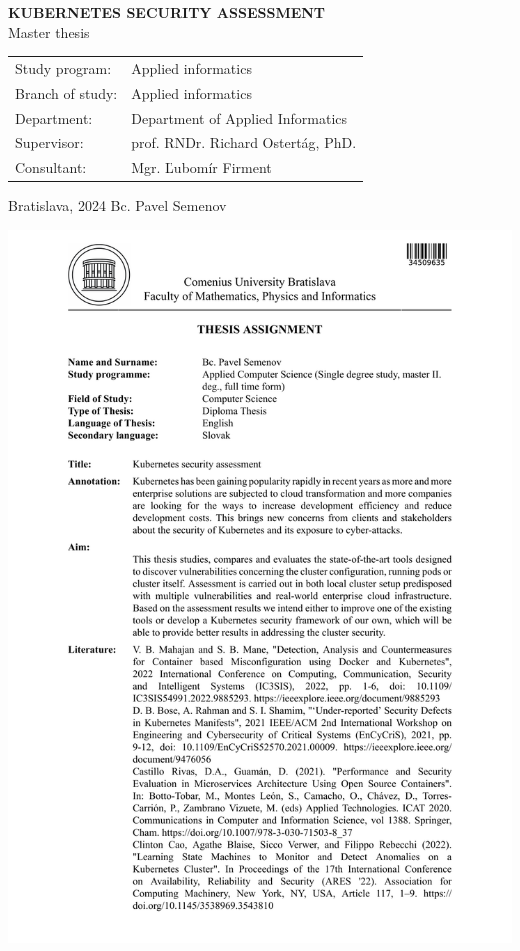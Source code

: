 \documentclass[12pt, oneside, openany]{book}
\def\mftitle{Kubernetes security assessment}
\def\mfthesistype{Master thesis}
\def\mfauthor{Bc. Pavel Semenov}
\def\mfskolitel{prof. RNDr. Richard Ostertág, PhD.}
\def\mfkonzultant{Mgr. Ľubomír Firment}
\def\mfplacedate{Bratislava, 2024}
\def\mfodbor{Applied informatics}
\def\program{Applied informatics}
\def\mfpracovisko{Department of Applied Informatics }
\begin{document}
\begin{center}
	\textbf{\MakeUppercase{\Large\mftitle}}\\
	\mfthesistype
\end{center}
\vfill


\begin{tabular}{l l}
Study program: & \program \\
Branch of study: & \mfodbor \\
Department: & \mfpracovisko \\
Supervisor: & \mfskolitel \\
Consultant: & \mfkonzultant \\
\end{tabular}

\vfill
\noindent
\mfplacedate \hfill
\mfauthor
\cleardoublepage




\newpage 
\thispagestyle{empty}
\hspace{-2cm}\includegraphics[page=1,width=1.1\textwidth]{assignment_en.PDF}
\end{document}
